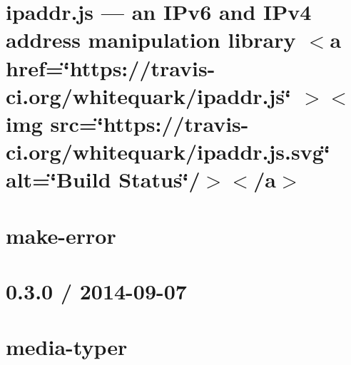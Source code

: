 \documentclass[twoside]{book}
\newcommand{\+}{\discretionary{\mbox{\scriptsize$\hookleftarrow$}}{}{}}
\begin{document}
\chapter{ipaddr.\+js — an IPv6 and IPv4 address manipulation library \texorpdfstring{$<$}{<}a href=\char`\"{}https\+://travis-\/ci.\+org/whitequark/ipaddr.\+js\char`\"{} \texorpdfstring{$>$}{>}\texorpdfstring{$<$}{<}img src=\char`\"{}https\+://travis-\/ci.\+org/whitequark/ipaddr.\+js.\+svg\char`\"{} alt=\char`\"{}\+Build Status\char`\"{}/\texorpdfstring{$>$}{>}\texorpdfstring{$<$}{<}/a\texorpdfstring{$>$}{>}}
\label{md__c___users_vaishnavi_jadhav__desktop__developer_code_mean_stack_example_server_node_modules_ipaddr_js__r_e_a_d_m_e}

\chapter{make-\/error}
\label{md__c___users_vaishnavi_jadhav__desktop__developer_code_mean_stack_example_server_node_modules_make_error__r_e_a_d_m_e}

\chapter{0.3.0 / 2014-\/09-\/07}
\label{md__c___users_vaishnavi_jadhav__desktop__developer_code_mean_stack_example_server_node_modules_media_typer__h_i_s_t_o_r_y}

\chapter{media-\/typer}
\label{md__c___users_vaishnavi_jadhav__desktop__developer_code_mean_stack_example_server_node_modules_media_typer__r_e_a_d_m_e}

\end{document}
